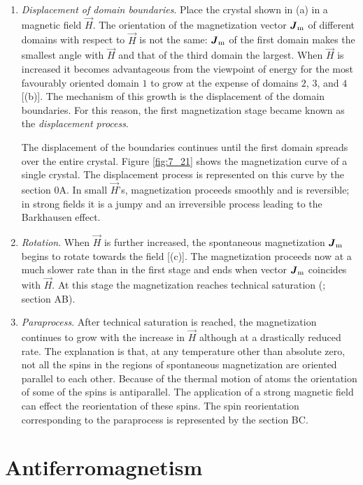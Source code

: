 \begin{enumerate}[(1)]
    \item \textit{Displacement of domain boundaries}. Place the crystal shown in (a) in a magnetic field $\vec{H}$. The orientation of the magnetization vector $\boldsymbol{J}_{\text{m}}$ of different domains with respect to $\vec{H}$ is not the same: $\boldsymbol{J}_{\text{m}}$ of the first domain makes the smallest angle with $\vec{H}$ and that of the third domain the largest. When $\vec{H}$ is increased it becomes advantageous from the viewpoint of energy for the most favourably oriented domain $1$ to grow at the expense of domains $2$, $3$, and $4$ [(b)]. The mechanism of this growth is the displacement     of the domain boundaries. For this reason, the first magnetization stage became known as the \textit{displacement process}.

    The displacement of the boundaries continues until the first domain spreads over the entire crystal. Figure \ref{fig:7_21} shows the magnetization curve of a single crystal. The displacement process is represented on this curve by the section $0$A. In small $\vec{H}$'s, magnetization proceeds smoothly and is reversible; in strong fields it is a jumpy and an irreversible process leading to the Barkhausen effect.

    \item \textit{Rotation}. When $\vec{H}$ is further increased, the spontaneous magnetization $\boldsymbol{J}_{\text{m}}$ begins to rotate towards the field [(c)]. The magnetization proceeds now at a much slower rate than in the first stage and ends when vector $\boldsymbol{J}_{\text{m}}$ coincides with $\vec{H}$. At this stage the magnetization reaches technical saturation (; section AB).

    \item \textit{Paraprocess}. After technical saturation is reached, the magnetization continues to grow with the increase in $\vec{H}$ although at a drastically reduced rate. The explanation is that, at any temperature other than absolute zero, not all the spins in the regions of spontaneous magnetization are oriented parallel to each other. Because of the thermal motion of atoms the orientation of some of the spins is antiparallel. The application of a strong magnetic field can effect the reorientation of these spins. The spin reorientation corresponding to the paraprocess is represented by the section BC.
\end{enumerate}

\section{Antiferromagnetism}\label{sec:69}

